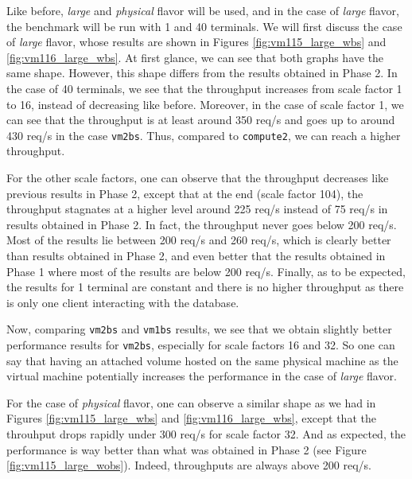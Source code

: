 Like before, \textit{large} and \textit{physical} flavor will be used, and in the case of \textit{large} flavor, the benchmark will be run with 1 and 40 terminals. 
We will first discuss the case of \textit{large} flavor, whose results are shown in Figures \ref{fig:vm115_large_wbs} and \ref{fig:vm116_large_wbs}.
At first glance, we can see that both graphs have the same shape. However, this shape differs from the results obtained in Phase 2. 
In the case of 40 terminals, we see that the throughput increases from scale factor 1 to 16, instead of decreasing like before. 
Moreover, in the case of scale factor 1, we can see that the throughput is at least around 350 req/s and goes up to around 430 req/s in the case \texttt{vm2bs}.
Thus, compared to \texttt{compute2}, we can reach a higher throughput.

For the other scale factors, one can observe that the throughput decreases like previous results in Phase 2, except that at the end (scale factor 104), the throughput stagnates at a higher level around 225 req/s instead of 75 req/s in results obtained in Phase 2. 
In fact, the throughput never goes below 200 req/s. 
Most of the results lie between 200 req/s and 260 req/s, which is clearly better than results obtained in Phase 2, and even better that the results obtained in Phase 1 where most of the results are below 200 req/s. 
Finally, as to be expected, the results for 1 terminal are constant and there is no higher throughput as there is only one client interacting with the database. 

Now, comparing \texttt{vm2bs} and \texttt{vm1bs} results, we see that we obtain slightly better performance results for \texttt{vm2bs}, especially for scale factors 16 and 32. 
So one can say that having an attached volume hosted on the same physical machine as the virtual machine potentially increases the performance in the case of \textit{large} flavor.

For the case of \textit{physical} flavor, one can observe a similar shape as we had in Figures \ref{fig:vm115_large_wbs} and \ref{fig:vm116_large_wbs}, except that the throuhput drops rapidly under 300 req/s for scale factor 32.
And as expected, the performance is way better than what was obtained in Phase 2 (see Figure \ref{fig:vm115_large_wobs}). 
Indeed, throughputs are always above 200 req/s.

